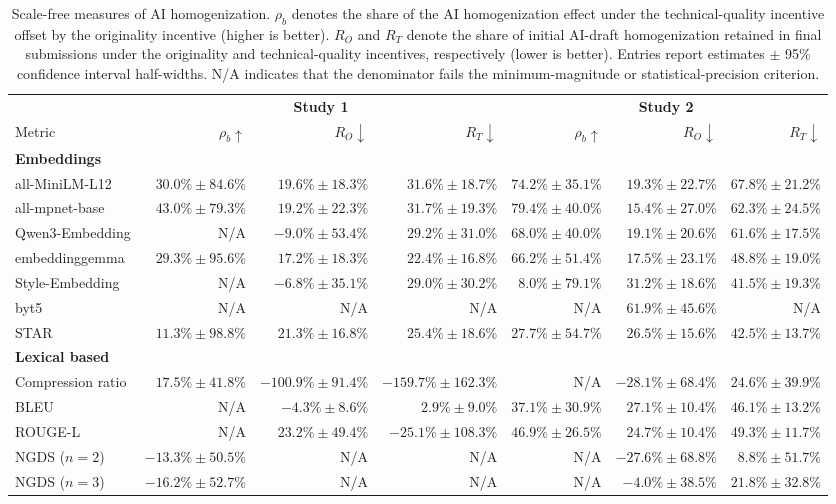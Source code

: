 \begin{table}[ht]
\centering
\small
\begin{tabular}{lrrrrrr}
\toprule
 & \multicolumn{3}{c}{\textbf{Study 1}} & \multicolumn{3}{c}{\textbf{Study 2}} \\
\cmidrule(lr){2-4}\cmidrule(lr){5-7}
Metric & $\rho_b\uparrow$ & $R_O\downarrow$ & $R_T\downarrow$ & $\rho_b\uparrow$ & $R_O\downarrow$ & $R_T\downarrow$ \\
\midrule
\rowcolor{lightgray}
\textbf{Embeddings} & & & & & & \\
all-MiniLM-L12 & $30.0\% \pm 84.6\%$ & $19.6\% \pm 18.3\%$ & $31.6\% \pm 18.7\%$ & $74.2\% \pm 35.1\%$ & $19.3\% \pm 22.7\%$ & $67.8\% \pm 21.2\%$ \\
all-mpnet-base & $43.0\% \pm 79.3\%$ & $19.2\% \pm 22.3\%$ & $31.7\% \pm 19.3\%$ & $79.4\% \pm 40.0\%$ & $15.4\% \pm 27.0\%$ & $62.3\% \pm 24.5\%$ \\
Qwen3-Embedding & N/A & $-9.0\% \pm 53.4\%$ & $29.2\% \pm 31.0\%$ & $68.0\% \pm 40.0\%$ & $19.1\% \pm 20.6\%$ & $61.6\% \pm 17.5\%$ \\
embeddinggemma & $29.3\% \pm 95.6\%$ & $17.2\% \pm 18.3\%$ & $22.4\% \pm 16.8\%$ & $66.2\% \pm 51.4\%$ & $17.5\% \pm 23.1\%$ & $48.8\% \pm 19.0\%$ \\
Style-Embedding & N/A & $-6.8\% \pm 35.1\%$ & $29.0\% \pm 30.2\%$ & $8.0\% \pm 79.1\%$ & $31.2\% \pm 18.6\%$ & $41.5\% \pm 19.3\%$ \\
byt5 & N/A & N/A & N/A & N/A & $61.9\% \pm 45.6\%$ & N/A \\
STAR & $11.3\% \pm 98.8\%$ & $21.3\% \pm 16.8\%$ & $25.4\% \pm 18.6\%$ & $27.7\% \pm 54.7\%$ & $26.5\% \pm 15.6\%$ & $42.5\% \pm 13.7\%$ \\
\midrule
\rowcolor{lightgray}
\textbf{Lexical based} & & & & & & \\
Compression ratio & $17.5\% \pm 41.8\%$ & $-100.9\% \pm 91.4\%$ & $-159.7\% \pm 162.3\%$ & N/A & $-28.1\% \pm 68.4\%$ & $24.6\% \pm 39.9\%$ \\
BLEU & N/A & $-4.3\% \pm 8.6\%$ & $2.9\% \pm 9.0\%$ & $37.1\% \pm 30.9\%$ & $27.1\% \pm 10.4\%$ & $46.1\% \pm 13.2\%$ \\
ROUGE-L & N/A & $23.2\% \pm 49.4\%$ & $-25.1\% \pm 108.3\%$ & $46.9\% \pm 26.5\%$ & $24.7\% \pm 10.4\%$ & $49.3\% \pm 11.7\%$ \\
NGDS ($n=2$) & $-13.3\% \pm 50.5\%$ & N/A & N/A & N/A & $-27.6\% \pm 68.8\%$ & $8.8\% \pm 51.7\%$ \\
NGDS ($n=3$) & $-16.2\% \pm 52.7\%$ & N/A & N/A & N/A & $-4.0\% \pm 38.5\%$ & $21.8\% \pm 32.8\%$ \\
\bottomrule
\end{tabular}
\caption{Scale-free measures of AI homogenization. $\rho_b$ denotes the share of the AI homogenization effect under the technical-quality incentive offset by the originality incentive (higher is better). $R_O$ and $R_T$ denote the share of initial AI-draft homogenization retained in final submissions under the originality and technical-quality incentives, respectively (lower is better). Entries report estimates $\pm$ 95\% confidence interval half-widths. N/A indicates that the denominator fails the minimum-magnitude or statistical-precision criterion.}
\label{tab:homogenization_retention}
\end{table}
